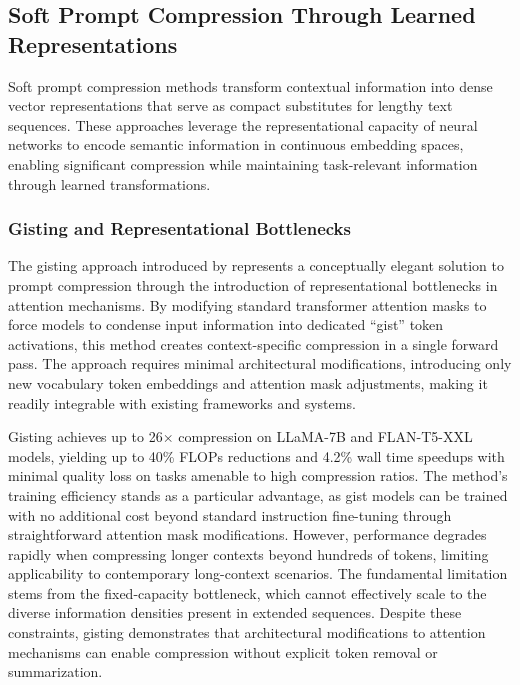 \documentclass[11pt,letterpaper]{article}
\begin{document}
\subsection{Soft Prompt Compression Through Learned Representations}

Soft prompt compression methods transform contextual information into dense vector representations that serve as compact substitutes for lengthy text sequences. These approaches leverage the representational capacity of neural networks to encode semantic information in continuous embedding spaces, enabling significant compression while maintaining task-relevant information through learned transformations.

\subsubsection{Gisting and Representational Bottlenecks}

The gisting approach introduced by \cite{mu2023learning} represents a conceptually elegant solution to prompt compression through the introduction of representational bottlenecks in attention mechanisms. By modifying standard transformer attention masks to force models to condense input information into dedicated ``gist'' token activations, this method creates context-specific compression in a single forward pass. The approach requires minimal architectural modifications, introducing only new vocabulary token embeddings and attention mask adjustments, making it readily integrable with existing frameworks and systems.

Gisting achieves up to 26$\times$ compression on LLaMA-7B and FLAN-T5-XXL models, yielding up to 40\% FLOPs reductions and 4.2\% wall time speedups with minimal quality loss on tasks amenable to high compression ratios. The method's training efficiency stands as a particular advantage, as gist models can be trained with no additional cost beyond standard instruction fine-tuning through straightforward attention mask modifications. However, performance degrades rapidly when compressing longer contexts beyond hundreds of tokens, limiting applicability to contemporary long-context scenarios. The fundamental limitation stems from the fixed-capacity bottleneck, which cannot effectively scale to the diverse information densities present in extended sequences. Despite these constraints, gisting demonstrates that architectural modifications to attention mechanisms can enable compression without explicit token removal or summarization.
\end{document}
